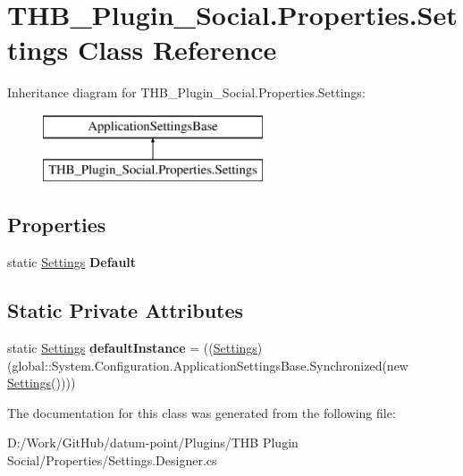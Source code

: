 \hypertarget{class_t_h_b___plugin___social_1_1_properties_1_1_settings}{}\section{T\+H\+B\+\_\+\+Plugin\+\_\+\+Social.\+Properties.\+Settings Class Reference}
\label{class_t_h_b___plugin___social_1_1_properties_1_1_settings}
Inheritance diagram for T\+H\+B\+\_\+\+Plugin\+\_\+\+Social.\+Properties.\+Settings\+:\begin{figure}[H]
\begin{center}
\leavevmode
\includegraphics[height=2.000000cm]{d5/dbf/class_t_h_b___plugin___social_1_1_properties_1_1_settings}
\end{center}
\end{figure}
\subsection*{Properties}
\begin{DoxyCompactItemize}
\item 
\mbox{\label{class_t_h_b___plugin___social_1_1_properties_1_1_settings_a561f116fda9ea9e2cee13c36295a5a8a}} 
static \mbox{\hyperlink{class_t_h_b___plugin___social_1_1_properties_1_1_settings}{Settings}} {\bfseries Default}
\end{DoxyCompactItemize}
\subsection*{Static Private Attributes}
\begin{DoxyCompactItemize}
\item 
\mbox{\label{class_t_h_b___plugin___social_1_1_properties_1_1_settings_ad13b332c3b0bb32f646f60e018fb93cd}} 
static \mbox{\hyperlink{class_t_h_b___plugin___social_1_1_properties_1_1_settings}{Settings}} {\bfseries default\+Instance} = ((\mbox{\hyperlink{class_t_h_b___plugin___social_1_1_properties_1_1_settings}{Settings}})(global\+::\+System.\+Configuration.\+Application\+Settings\+Base.\+Synchronized(new \mbox{\hyperlink{class_t_h_b___plugin___social_1_1_properties_1_1_settings}{Settings}}())))
\end{DoxyCompactItemize}


The documentation for this class was generated from the following file\+:\begin{DoxyCompactItemize}
\item 
D\+:/\+Work/\+Git\+Hub/datum-\/point/\+Plugins/\+T\+H\+B Plugin Social/\+Properties/Settings.\+Designer.\+cs\end{DoxyCompactItemize}
